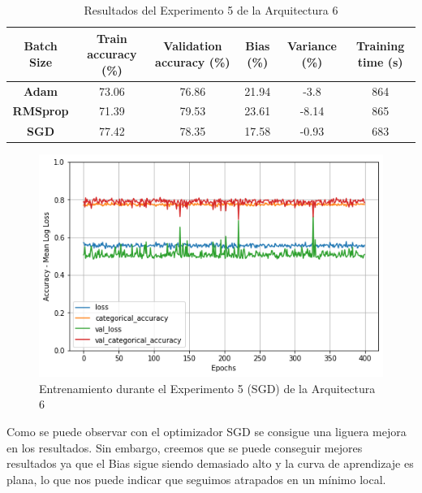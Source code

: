 \documentclass{article}
\begin{document}
    
   
   \begin{table}[!h]
				\begin{center}
					\begin{tabular}{ c | c | c | c | c | c |}
						 \textbf{Batch Size} & \textbf{Train accuracy (\%)} & \textbf{Validation accuracy (\%)} & \textbf{Bias (\%)} & \textbf{Variance (\%)} & \textbf{Training time (s)} \\ \hline
						\textbf{Adam } & 73.06   & 76.86 &  21.94 & -3.8 &864   \\ \hline
                        \textbf{RMSprop } & 71.39   &79.53  & 23.61  & -8.14  &  865   \\ \hline
                        \textbf{SGD} &  77.42   &  78.35& 17.58 & -0.93 &   683  \\ \hline
					\end{tabular}
					\caption{Resultados del Experimento 5 de la Arquitectura 6}
					\label{tab:res-a2-e5}
				\end{center}
			\end{table}
   
   \begin{figure}[!h]
				\begin{center}
					\includegraphics[scale=0.5]{Images/tr-a6-e5(SGD).png}		
					\caption{Entrenamiento durante el Experimento 5 (SGD) de la Arquitectura 6}	
					\label{tab:tr-a6-e2}
				\end{center}
			\end{figure}
   
   Como se puede observar con el optimizador SGD se consigue una liguera mejora en los resultados. Sin embargo, creemos que se puede conseguir mejores resultados ya que el Bias sigue siendo demasiado alto y la curva de aprendizaje es plana, lo que nos puede indicar que seguimos atrapados en un mínimo local. 
\end{document}
